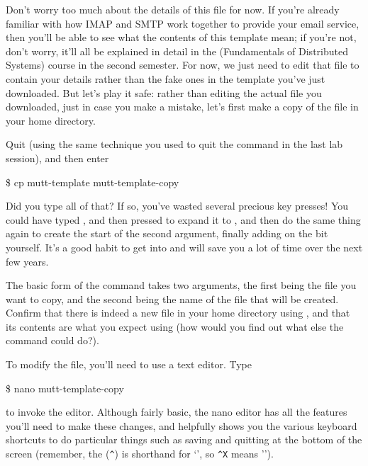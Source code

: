 Don't worry too much about the details of this file for now. If you're already familiar with how IMAP and SMTP work together to provide your email service, then you'll be able to see what the contents of this template mean; if you're not, don't worry, it'll all be explained in detail in the  (Fundamentals of Distributed Systems) course in the second semester. For now, we just need to edit that file to contain your details rather than the fake ones in the template you've just downloaded. But let's play it safe: rather than editing the actual file you downloaded, just in case you make a mistake, let's first make a copy of the file in your home directory. 


Quit  (using the same technique you used to quit the  command in the last lab session), and then enter

\begin{ttoutenv}
\$ cp mutt-template mutt-template-copy
\end{ttoutenv}

Did you type all of that? If so, you've wasted several precious key presses! You could have typed , and then pressed  to expand it to , and then do the same thing again to create the start of the second argument, finally adding on the  bit yourself. It's a good habit to get into and will save you a lot of time over the next few years.

The basic form of the  command takes two arguments, the first being the file you want to copy, and the second being the name of the file that will be created. Confirm that there is indeed a new file in your home directory using , and that its contents are what you expect using  (how would you find out what else the  command could do?). 

To modify the file, you'll need to use a text editor. Type 
\begin{ttoutenv}
\$ nano mutt-template-copy
\end{ttoutenv}

to invoke the  editor. Although fairly basic, the nano editor has all the features you'll need to make these changes, and helpfully shows you the various keyboard shortcuts to do particular things such as saving and quitting at the bottom of the screen (remember, the  (\texttt{\textasciicircum}) is shorthand for `', so \texttt{\textasciicircum X} means '').

